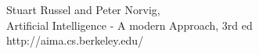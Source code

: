 \begin{thebibliography}{9}

Stuart Russel and Peter Norvig,\\
Artificial Intelligence - A modern Approach, 3rd ed\\
http://aima.cs.berkeley.edu/

\end{thebibliography}